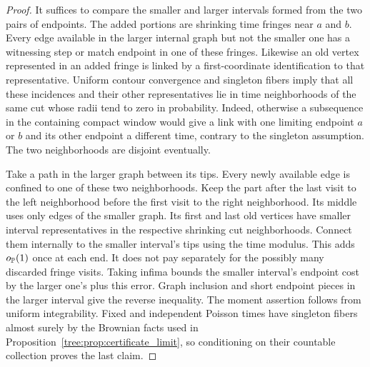 \begin{proof}
It suffices to compare the smaller and larger intervals formed from
the two pairs of endpoints.  The added portions are shrinking time
fringes near $a$ and $b$.  Every edge available in the larger internal
graph but not the smaller one has a witnessing step or match endpoint
in one of these fringes.  Likewise an old vertex represented in an
added fringe is linked by a first-coordinate identification to that
representative.  Uniform contour convergence and singleton fibers
imply that all these incidences and their other representatives lie
in time neighborhoods of the same cut whose radii tend to zero in
probability.  Indeed, otherwise a subsequence in the containing
compact window would give a link with one limiting endpoint $a$
or $b$ and its other endpoint a different time, contrary to the
singleton assumption.  The two neighborhoods are disjoint eventually.

Take a path in the larger graph between its tips.  Every newly
available edge is confined to one of these two neighborhoods.  Keep
the part after the last visit to the left neighborhood before the
first visit to the right neighborhood.  Its middle uses only edges
of the smaller graph.  Its first and last old vertices have smaller
interval representatives in the respective shrinking cut neighborhoods.
Connect them internally to the smaller interval's tips using the
time modulus.  This adds $o_{\mathbb P}(1)$ once at each end.  It does
not pay separately for the possibly many discarded fringe visits.
Taking infima bounds the smaller interval's endpoint cost by the
larger one's plus this error.  Graph inclusion and short endpoint
pieces in the larger interval give the reverse inequality.  The
moment assertion follows from uniform integrability.  Fixed and
independent Poisson times have singleton fibers almost surely by
the Brownian facts used in Proposition~\ref{tree:prop:certificate_limit},
so conditioning on their countable collection proves the last claim.
\end{proof}


